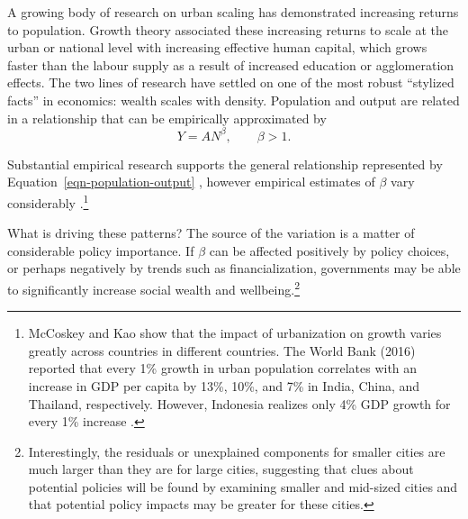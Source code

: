 A growing body of research on urban scaling has demonstrated increasing returns to population. Growth theory associated these increasing returns to scale at the urban or national level with increasing effective human capital, which grows faster than the labour supply as a result of increased education or agglomeration effects. The two lines of research have settled on one of the most robust ``stylized facts'' in economics: wealth scales with density. Population and output are related in a relationship that can be empirically approximated by
\begin{equation}
    Y=AN^\beta,\qquad \beta>1. \label{eqn-population-output}
\end{equation}

Substantial empirical research supports the general relationship represented by Equation~\ref{eqn-population-output} \cite{GET_REF}, however empirical estimates of $\beta$ vary considerably \cite{rosenthalEvidenceNatureSources2004, bettencourtIntroductionUrbanScience2021, loboUrbanScalingProduction2013}.\footnote{McCoskey and Kao \cite{mccoskeyPanelDataInvestigation} show that the impact of urbanization on growth varies greatly across countries in different countries. The World Bank (2016) reported that every 1\% growth in urban population correlates with an increase in GDP per capita by 13\%, 10\%, and 7\% in India, China, and Thailand, respectively. However, Indonesia realizes only 4\% GDP growth for every 1\% increase \cite{haryantotriRelationshipUrbanizationEducation2021}.} 


What is driving these patterns? The source of the variation is a matter of considerable policy importance. If $\beta$ can be affected positively by policy choices, or perhaps negatively by trends such as financialization, governments may be able to significantly increase social wealth and wellbeing.\footnote{Interestingly, the residuals or unexplained components for smaller cities are much larger than they are for large cities, suggesting that clues about potential policies will be found by examining smaller and mid-sized cities and that potential policy impacts may be greater for these cities.}

